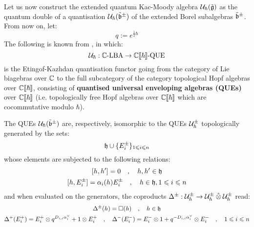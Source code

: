         Let us now construct the extended quantum Kac-Moody algebra $\mathcal{U}_{\hbar}(\tilde{\mathfrak{g}})$ as the quantum double of a quantisation $\mathcal{U}_{\hbar}(\tilde{\mathfrak{b}}^{\pm})$ of the extended Borel subalgebras $\tilde{\mathfrak{b}}^{\pm}$. From now on, let:
            $$q := e^{\frac12 \hbar}$$
        The following is known from \cite[Propositions 3.1 and 3.2]{etingof_kazhdan_quantisation_6}, in which:
            $$\mathcal{U}_{\hbar}: \mathbb{C}\text{-}\mathrm{LBA} \to \mathbb{C}[\![\hbar]\!]\text{-}\mathrm{QUE}$$
        is the Etingof-Kazhdan quantisation functor going from the category of Lie biagebras over $\mathbb{C}$ to the full subcategory of the category topological Hopf algebras over $\mathbb{C}[\![\hbar]\!]$, consisting of \textbf{quantised universal enveloping algebras (QUEs)} over $\mathbb{C}[\![\hbar]\!]$ (i.e. topologically free Hopf algebras over $\mathbb{C}[\![\hbar]\!]$ which are cocommutative modulo $\hbar$).
        \begin{proposition} \label{prop: extended_quantum_borel_subalgebras}
            The QUEs $\mathcal{U}_{\hbar}(\tilde{\mathfrak{b}}^{\pm})$ are, respectively, isomorphic to the QUEs $\mathcal{U}_{\hbar}^{\pm}$ topologically generated by the sets:
                $$\mathfrak{h} \cup \{ E_i^{\pm} \}_{1 \leqslant i \leqslant n}$$
            whose elements are subjected to the following relations:
                \begin{equation} \label{equation: extended_quantum_borel_subalgebras_commutation_relations}
                    \begin{gathered}
                        [h, h'] = 0 \quad, \quad h, h' \in \h
                        \\
                        [h, E_i^{\pm}] = \alpha_i(h) E_i^{\pm} \quad, \quad h \in \h, 1 \leq i \leq n 
                    \end{gathered} 
                \end{equation}
            and when evaluated on the generators, the coproducts $\Delta^{\pm}: \calU_{\hbar}^{\pm} \to \calU_{\hbar}^{\pm} \hattensor \calU_{\hbar}^{\pm}$ read:
                \begin{equation} \label{equation: extended_quantum_borel_subalgebras_coproducts}
                    \begin{gathered}
                        \Delta^{\pm}(h) = \Box(h) \quad, \quad h \in \h
                        \\
                        \Delta^+(E_i^+) = E_i^+ \tensor q^{D_{i, i} \alpha_i^{\vee}} + 1 \tensor E_i^+ \quad, \quad \Delta^-(E_i^-) = E_i^- \tensor 1 + q^{-D_{i, i} \alpha_i^{\vee}} \tensor E_i^- \quad, \quad 1 \leq i \leq n 
                    \end{gathered}
                \end{equation}
        \end{proposition}

